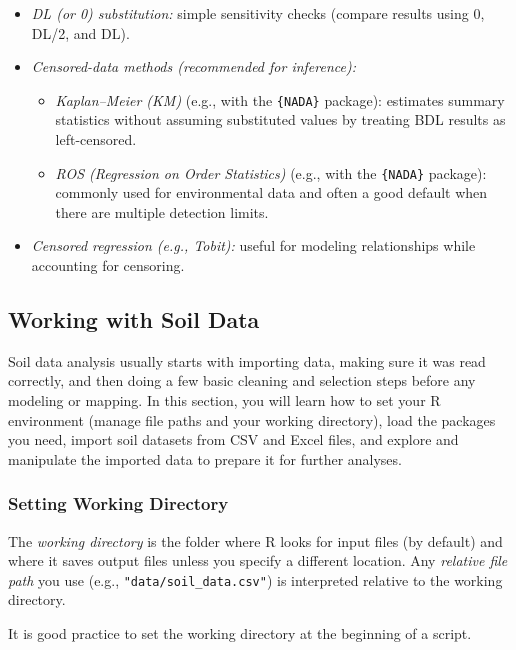 \documentclass[
  10pt,
  b5paper,
  oneside]{book}
\providecommand{\tightlist}{%
  \setlength{\itemsep}{0pt}\setlength{\parskip}{0pt}}
\begin{document}
\begin{itemize}
\item
  \emph{DL (or 0) substitution:} simple sensitivity checks (compare results using 0, DL/2, and DL).
\item
  \emph{Censored-data methods (recommended for inference):}

  \begin{itemize}
  \tightlist
  \item
    \emph{Kaplan--Meier (KM)} (e.g., with the \texttt{\{NADA\}} package): estimates summary statistics without assuming substituted values by treating BDL results as left-censored.
  \item
    \emph{ROS (Regression on Order Statistics)} (e.g., with the \texttt{\{NADA\}} package): commonly used for environmental data and often a good default when there are multiple detection limits.
  \end{itemize}
\item
  \emph{Censored regression (e.g., Tobit):} useful for modeling relationships while accounting for censoring.
\end{itemize}

\subsection{Working with Soil Data}\label{soil-data}

Soil data analysis usually starts with importing data, making sure it was read correctly, and then doing a few basic cleaning and selection steps before any modeling or mapping. In this section, you will learn how to set your R environment (manage file paths and your working directory), load the packages you need, import soil datasets from CSV and Excel files, and explore and manipulate the imported data to prepare it for further analyses.

\subsubsection{Setting Working Directory}\label{set-directory}

The \emph{working directory} is the folder where R looks for input files (by default) and where it saves output files unless you specify a different location. Any \emph{relative file path} you use (e.g., \texttt{"data/soil\_data.csv"}) is interpreted relative to the working directory.

It is good practice to set the working directory at the beginning of a script.
\end{document}
